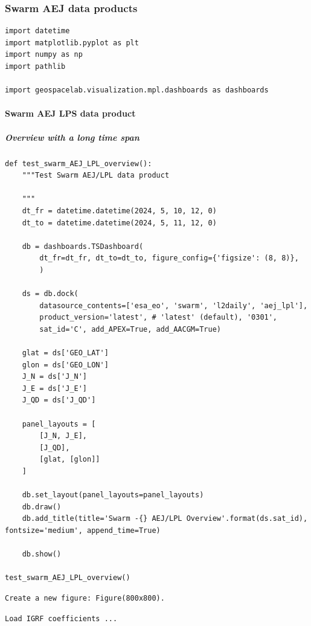 \subsubsection{Swarm AEJ data products}

\begin{verbatim}
import datetime
import matplotlib.pyplot as plt
import numpy as np
import pathlib

import geospacelab.visualization.mpl.dashboards as dashboards
\end{verbatim}

\paragraph{Swarm AEJ LPS data product}

\subparagraph{Overview with a long time span}

\begin{verbatim}
def test_swarm_AEJ_LPL_overview():
    """Test Swarm AEJ/LPL data product
    
    """
    dt_fr = datetime.datetime(2024, 5, 10, 12, 0)
    dt_to = datetime.datetime(2024, 5, 11, 12, 0)

    db = dashboards.TSDashboard(
        dt_fr=dt_fr, dt_to=dt_to, figure_config={'figsize': (8, 8)},
        )

    ds = db.dock(
        datasource_contents=['esa_eo', 'swarm', 'l2daily', 'aej_lpl'], 
        product_version='latest', # 'latest' (default), '0301', 
        sat_id='C', add_APEX=True, add_AACGM=True)

    glat = ds['GEO_LAT']
    glon = ds['GEO_LON']
    J_N = ds['J_N']
    J_E = ds['J_E']
    J_QD = ds['J_QD']
    
    panel_layouts = [
        [J_N, J_E],
        [J_QD],
        [glat, [glon]]
    ]

    db.set_layout(panel_layouts=panel_layouts)
    db.draw()
    db.add_title(title='Swarm -{} AEJ/LPL Overview'.format(ds.sat_id), fontsize='medium', append_time=True)

    db.show()
    
test_swarm_AEJ_LPL_overview()
\end{verbatim}

\begin{verbatim}
Create a new figure: Figure(800x800).
\end{verbatim}

\begin{verbatim}
Load IGRF coefficients ...
\end{verbatim}


